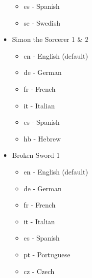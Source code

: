 \begin{itemize}
\begin{itemize}
  \item es  - Spanish
  \item se  - Swedish
  \end{itemize}
\item Simon the Sorcerer 1 \& 2
  \begin{itemize}
  \item en  - English (default)
  \item de  - German
  \item fr  - French
  \item it  - Italian
  \item es  - Spanish
  \item hb  - Hebrew
  \end{itemize}
\item Broken Sword 1
  \begin{itemize}
  \item en  - English (default)
  \item de  - German
  \item fr  - French
  \item it  - Italian
  \item es  - Spanish
  \item pt  - Portuguese
  \item cz  - Czech
  \end{itemize}
\end{itemize}

